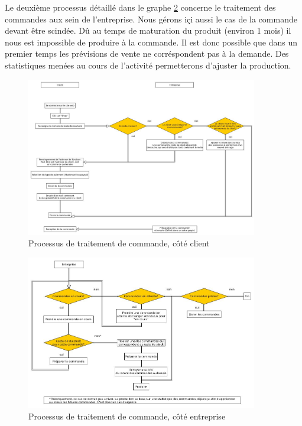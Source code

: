 \documentclass[10pt,a4paper]{article}
\begin{document}
Le deuxième processus détaillé dans le graphe \ref{cmdUsine} concerne le traitement des commandes aux sein de l'entreprise.
Nous gérons içi aussi le cas de la commande devant être scindée.
Dû au temps de maturation du produit (environ 1 mois) il nous est impossible de produire à la commande.
Il est donc possible que dans un premier temps les prévisions de vente ne corréspondent pas à la demande.
Des statistiques menées au cours de l'activité permetterons d'ajuster la production.
\begin{figure}[h!]
\centering
\includegraphics[width=0.9\textwidth]{../flowchart/commandeInternet.jpg}
\caption{Processus de traitement de commande, côté client}
\label{cmdInternet}
\end{figure}

\begin{figure}[h!]
\centering
\includegraphics[width=0.9\textwidth]{../flowchart/commande.jpg}
\caption{Processus de traitement de commande, côté entreprise}
\label{cmdUsine}
\end{figure}
\clearpage
\end{document}
